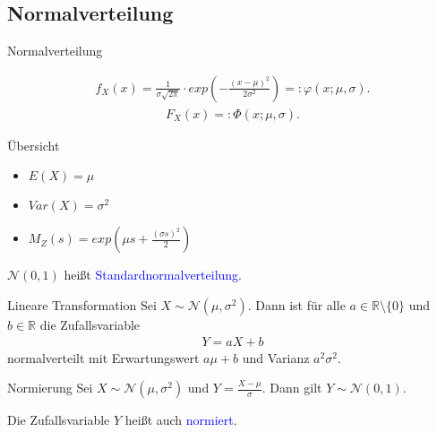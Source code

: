 \documentclass{beamer}
\def\padding{\vspace{0.5cm}}
\def\b{\textcolor{blue}}
\begin{document}
\subsection{Normalverteilung}
\begin{frame}{Normalverteilung}
    \begin{definition}
        \begin{align*}
            f_X(x) = \frac{1}{\sigma \sqrt{2 \pi}} \cdot exp\left(-\frac{(x - \mu)^2}{2 \sigma^2}\right) =: \varphi(x;\mu,\sigma).
        \end{align*}
        \begin{align*}
            F_X(x) =: \Phi(x;\mu,\sigma).
        \end{align*}\pause
        \begin{exampleblock}{Übersicht}
            \begin{itemize}
                \item $E(X) = \mu$\pause
                \item $Var(X) = \sigma^2$\pause
                \item $M_Z(s) = exp(\mu s + \frac{(\sigma s)^2}{2})$
            \end{itemize}
        \end{exampleblock}
    \end{definition}
\end{frame}

\begin{frame}
    $\mathcal{N}(0,1)$ heißt \b{Standardnormalverteilung}.\pause\par\padding
    \begin{block}{Lineare Transformation}
        Sei $X \sim \mathcal{N}(\mu, \sigma^2)$. Dann ist für alle $a \in \mathbb{R} \setminus \{0\}$ und $b \in \mathbb{R}$ die Zufallsvariable
        \begin{align*}
            Y = a X + b
        \end{align*}
        normalverteilt mit Erwartungswert $a \mu + b$ und Varianz $a^2 \sigma^2$.
    \end{block}\pause\par\padding
    \begin{block}{Normierung}
        Sei $X \sim \mathcal{N}(\mu, \sigma^2)$ und $Y = \frac{X - \mu}{\sigma}$. Dann gilt $Y \sim \mathcal{N}(0,1)$.\pause\par
        Die Zufallsvariable $Y$ heißt auch \b{normiert}.
    \end{block}
\end{frame}
\end{document}
